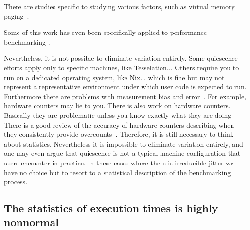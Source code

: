 \documentclass[conference]{IEEEtran}
\begin{document}
There are studies specific to studying various factors, such as virtual memory paging~\cite{Oyama2014,Oyama2016}.

Some of this work has even been specifically applied to performance benchmarking \cite{Alcocer2015,Barrett2016}.

Nevertheless, it is not possible to eliminate variation entirely.
Some quiescence efforts apply only to specific machines, like Tesselation...
Others require you to run on a dedicated operating system, like Nix...
which is fine but may not represent a representative environment under which user
code is expected to run.
Furthermore there are problems with measurement bias and error~\cite{Mytkowicz2009}.
For example, hardware counters may lie to you.
There is also work on hardware counters. Basically they are problematic unless you know exactly what they are doing. There is a good review of the accuracy of hardware counters describing when they consistently provide overcounts~\cite{Weaver2013}.
Therefore, it is still necessary to think about statistics.
Nevertheless it is impossible to eliminate variation
entirely, and one may even argue that quiescence is not a typical machine
configuration that users encounter in practice.
In these cases where there is irreducible jitter we have no choice but to resort to a statistical description of the benchmarking process.


\subsection{The statistics of execution times is highly nonnormal}
\end{document}
